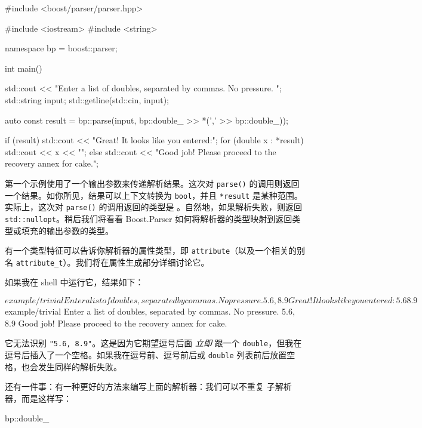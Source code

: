 \begin{code}
#include <boost/parser/parser.hpp>

#include <iostream>
#include <string>


namespace bp = boost::parser;

int main()
{
    std::cout << "Enter a list of doubles, separated by commas.  No pressure. ";
    std::string input;
    std::getline(std::cin, input);

    auto const result = bp::parse(input, bp::double_ >> *(',' >> bp::double_));

    if (result) {
        std::cout << "Great! It looks like you entered:\n";
        for (double x : *result) {
            std::cout << x << "\n";
        }
    } else {
        std::cout
            << "Good job!  Please proceed to the recovery annex for cake.\n";
    }
}
\end{code}

第一个示例使用了一个输出参数来传递解析结果。这次对 \texttt{parse()} 的调用则返回一个结果。如你所见，结果可以上下文转换为 \texttt{bool}，并且 \texttt{*result} 是某种范围。实际上，这次对 \texttt{parse()} 的调用返回的类型是 。自然地，如果解析失败，则返回 \texttt{std::nullopt}。稍后我们将看看 Boost.Parser 如何将解析器的类型映射到返回类型或填充的输出参数的类型。


\begin{marker}
有一个类型特征可以告诉你解析器的属性类型，即 \texttt{attribute}（以及一个相关的别名 \texttt{attribute\_t}）。我们将在属性生成部分详细讨论它。
\end{marker}

如果我在 shell 中运行它，结果如下：

\begin{code}
$ example/trivial
Enter a list of doubles, separated by commas.  No pressure. 5.6,8.9
Great! It looks like you entered:
5.6
8.9
$ example/trivial
Enter a list of doubles, separated by commas.  No pressure. 5.6, 8.9
Good job!  Please proceed to the recovery annex for cake.
\end{code}

它无法识别 \texttt{"5.6, 8.9"}。这是因为它期望逗号后面 \emph{立即} 跟一个 \texttt{double}，但我在逗号后插入了一个空格。如果我在逗号前、逗号前后或 \texttt{double} 列表前后放置空格，也会发生同样的解析失败。

还有一件事：有一种更好的方法来编写上面的解析器：我们可以不重复  子解析器，而是这样写：

\begin{code}
bp::double_ %
\end{code}

